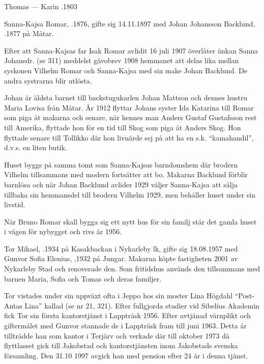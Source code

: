 Thomas   ---  Karin .1803






Sanna-Kajsa Romar, .1876, gifte sig 14.11.1897 med Johan Johansson Backlund, .1877 på Måtar.

Efter att Sanna-Kajsas far Isak Romar avlidit 16 juli 1907 överlåter änkan Sanna Johansdr. (se 311) meddelst gåvobrev 1908 hemmanet att delas lika mellan syskonen Vilhelm Romar och Sanna-Kajsa med sin make Johan Backlund. De andra systrarna blir utlösta.

Johan är äldsta barnet till backstugukarlen Johan Mattson och dennes hustru Maria Lovisa från Måtar. År 1912 flyttar Johans syster Ida Katarina till Romar som piga åt makarna och senare, när hennes man Anders Gustaf Gustafsson rest till Amerika, flyttade hon för en tid
till Skog som piga åt Anders Skog. Hon flyttade senare till Tollikko där hon livnärde sej på att ha en s.k. ``kamahandil'', d.v.s. en liten butik.

Huset byggs på samma tomt som Sanna-Kajsas barndomshem där brodern Vilhelm tillsammans med modern fortsätter att bo. Makarna Backlund förblir barnlösa och när Johan Backlund avlider 1929 väljer Sanna-Kajsa att sälja tillbaka sin hemmansdel till brodern Vilhelm 1929, men behåller huset under sin livstid.

När Bruno Romar skall bygga sig ett nytt hus för sin familj står det gamla huset i vägen för nybygget och rivs år 1956.






Tor Mikael, .1934 på Kasakbackan i Nykarleby lk, gifte sig 18.08.1957 med Gunvor Sofia Elenius, ,1932 på Jungar. Makarna köpte fastigheten 2001 av Nykarleby Stad och renoverade den. Som fritidshus används den tillsammans med barnen Maria,
Sofia och Tomas och deras familjer.

Tor vistades under sin uppväxt ofta i Jeppo hos sin moster Lina Högdahl ``Post-Antas Lina'' kallad (se nr 21, 321). Efter fullgjorda studier vid Sibelius Akademin fick Tor sin första kantorstjänst i Lappträsk 1956. Efter avtjänad värnplikt och giftermålet med Gunvor stannade de i Lappträsk fram till juni 1963. Detta år tillträdde han som kantor i Terjärv och verkade där till oktober 1973 då flyttlasset gick till Jakobstad och kantorstjänsten inom Jakobstads svenska församling. Den 31.10 1997 avgick han med pension efter 24 år i denna tjänst.

